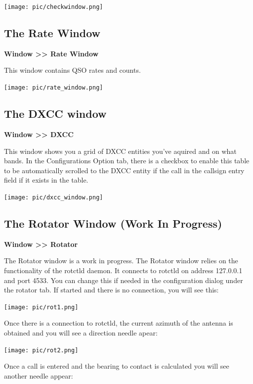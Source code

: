 \documentclass{article}
\begin{document}
\vspace{0.5cm}
\texttt{[image: pic/checkwindow.png]}
\newpage
\subsection{The Rate Window}

\textbf{Window >> Rate Window}

This window contains QSO rates and counts.

\vspace{0.5cm}
\texttt{[image: pic/rate\_window.png]}

\subsection{The DXCC window}
\textbf{Window >> DXCC}

This window shows you a grid of DXCC entities you've aquired and on what bands. In the Configurations Option tab, there is a checkbox to enable this table to be automatically scrolled to the DXCC entity if the call in the callsign entry field if it exists in the table.

\vspace{0.5cm}
\texttt{[image: pic/dxcc\_window.png]}

\subsection{The Rotator Window (Work In Progress)}
\textbf{Window >> Rotator}

The Rotator window is a work in progress. The Rotator window relies on the functionality of the rotctld daemon. It connects to rotctld on address 127.0.0.1 and port 4533. You can change this if needed in the configuration dialog under the rotator tab. If started and there is no connection, you will see this:

\vspace{0.5cm}
\texttt{[image: pic/rot1.png]}
\vspace{0.5cm}

Once there is a connection to rotctld, the current azimuth of the antenna is obtained and you will see a direction needle apear:

\vspace{0.5cm}
\texttt{[image: pic/rot2.png]}
\vspace{0.5cm}

Once a call is entered and the bearing to contact is calculated you will see another needle appear:
\end{document}
